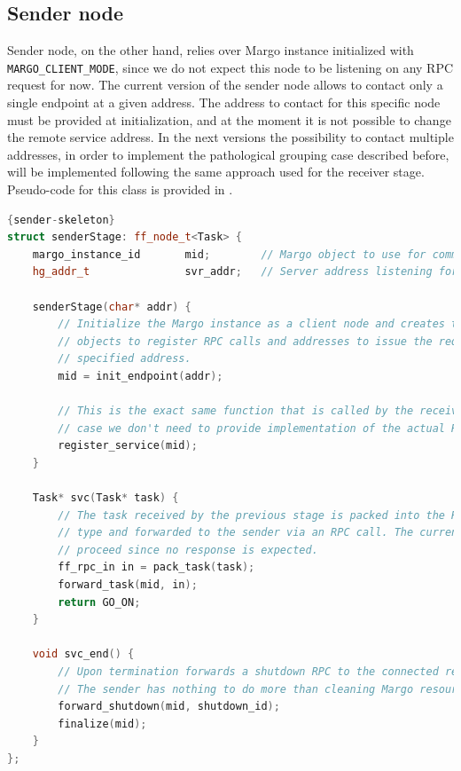 \subsection{Sender node}
Sender node, on the other hand, relies over Margo instance initialized with \texttt{MARGO\_CLIENT\_MODE}, since we do not expect this node to be listening on any RPC request for now.  The current version of the sender node allows to contact only a single endpoint at a given address. The address to contact for this specific node must be provided at initialization, and at the moment it is not possible to change the remote service address. In the next versions the possibility to contact multiple addresses, in order to implement the pathological grouping case described before, will be implemented following the same approach used for the receiver stage. Pseudo-code for this class is provided in .

\begin{lstlisting}[language=C++, style=mystyle, caption={Sender node pseudo-code.}, label={sender-skeleton}]{sender-skeleton}
struct senderStage: ff_node_t<Task> {
    margo_instance_id       mid;        // Margo object to use for communications
    hg_addr_t               svr_addr;   // Server address listening for incoming RPCs

    senderStage(char* addr) {
        // Initialize the Margo instance as a client node and creates the necessary
        // objects to register RPC calls and addresses to issue the requests to the
        // specified address.
        mid = init_endpoint(addr);
        
        // This is the exact same function that is called by the receiver, but in this
        // case we don't need to provide implementation of the actual RPC function.
        register_service(mid);
    }

    Task* svc(Task* task) {
        // The task received by the previous stage is packed into the RPC registered
        // type and forwarded to the sender via an RPC call. The current node can
        // proceed since no response is expected.
        ff_rpc_in in = pack_task(task);
        forward_task(mid, in);
        return GO_ON;
    }

    void svc_end() {
        // Upon termination forwards a shutdown RPC to the connected receiver node.
        // The sender has nothing to do more than cleaning Margo resources. 
        forward_shutdown(mid, shutdown_id);
        finalize(mid);
    }
};
\end{lstlisting}

